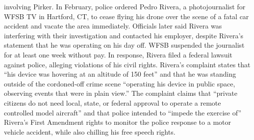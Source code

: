 involving Pirker. In February, police ordered Pedro Rivera, a photojournalist
for WFSB TV in Hartford, CT, to cease flying his drone over the scene of a
fatal car accident and vacate the area immediately. Officials later said Rivera
was interfering with their investigation and contacted his employer, despite
Rivera's statement that he was operating on his day off. WFSB suspended
the journalist for at least one week without pay. In response, Rivera filed a
federal lawsuit against police, alleging violations of his civil rights.
Rivera's complaint states that ``his device was hovering at an altitude of 150
feet'' and that he was standing outside of the cordoned-off crime scene
``operating his device in public space, observing events that were in plain
view.'' The complaint claims that ``private citizens do not need local, state,
or federal approval to operate a remote controlled model aircraft'' and that
police intended to ``impede the exercise of'' Rivera's First Amendment rights
to monitor the police response to a motor vehicle accident, while also chilling
his free speech rights.

